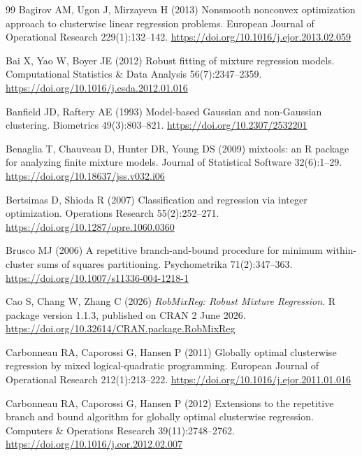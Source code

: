 \begin{thebibliography}{99}
\small
{} Bagirov AM, Ugon J, Mirzayeva H (2013) Nonsmooth nonconvex optimization approach to clusterwise linear regression problems. European Journal of Operational Research 229(1):132--142. \url{https://doi.org/10.1016/j.ejor.2013.02.059}

 Bai X, Yao W, Boyer JE (2012) Robust fitting of mixture regression models. Computational Statistics \& Data Analysis 56(7):2347--2359. \url{https://doi.org/10.1016/j.csda.2012.01.016}

 Banfield JD, Raftery AE (1993) Model-based Gaussian and non-Gaussian clustering. Biometrics 49(3):803--821. \url{https://doi.org/10.2307/2532201}

 Benaglia T, Chauveau D, Hunter DR, Young DS (2009) mixtools: an R package for analyzing finite mixture models. Journal of Statistical Software 32(6):1--29. \url{https://doi.org/10.18637/jss.v032.i06}

 Bertsimas D, Shioda R (2007) Classification and regression via integer optimization. Operations Research 55(2):252--271. \url{https://doi.org/10.1287/opre.1060.0360}

 Brusco MJ (2006) A repetitive branch-and-bound procedure for minimum within-cluster sums of squares partitioning. Psychometrika 71(2):347--363. \url{https://doi.org/10.1007/s11336-004-1218-1}

 Cao S, Chang W, Zhang C (2026) \textit{RobMixReg: Robust Mixture Regression}. R package version 1.1.3, published on CRAN 2 June 2026. \url{https://doi.org/10.32614/CRAN.package.RobMixReg}

 Carbonneau RA, Caporossi G, Hansen P (2011) Globally optimal clusterwise regression by mixed logical-quadratic
programming. European Journal of Operational Research 212(1):213--222. \url{https://doi.org/10.1016/j.ejor.2011.01.016}

 Carbonneau RA, Caporossi G, Hansen P (2012) Extensions to the repetitive branch and bound algorithm for globally
optimal clusterwise regression. Computers \& Operations Research 39(11):2748--2762. \url{https://doi.org/10.1016/j.cor.2012.02.007}


\end{thebibliography}
